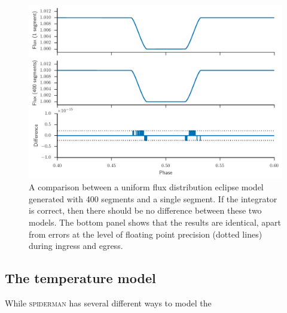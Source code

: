\documentclass[a4paper,fleqn,usenatbib]{mnras}
\begin{document}
\begin{figure}
\begin{center}
\includegraphics[width=\columnwidth]{img/precision.pdf}
\caption{A comparison between a uniform flux distribution eclipse model generated with 400 segments and a single segment. If the integrator is correct, then there should be no difference between these two models. The bottom panel shows that the results are identical, apart from errors at the level of floating point precision (dotted lines) during ingress and egress.}
\label{fig:precision}
\end{center}
\end{figure}

\subsection{The temperature model}\label{sec:temp model}

While \textsc{spiderman} has several different ways to model the 
\end{document}
